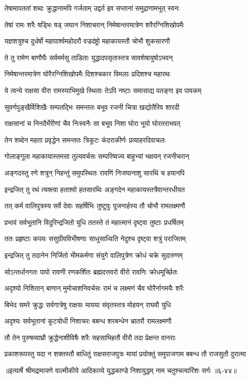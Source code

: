 \twolineshloka
{तेषामापततां शब्दः क्रुद्धानामपि गर्जताम्}
{उद्वर्त इव सप्तानां समुद्राणामभूत् स्वनः} %

\twolineshloka
{तेषां रामः शरैः षड्भिः षड् जघान निशाचरान्}
{निमेषान्तरमात्रेण शरैरग्निशिखोपमैः} %

\twolineshloka
{यज्ञशत्रुश्च दुर्धर्षो महापार्श्वमहोदरौ}
{वज्रदंष्ट्रो महाकायस्तौ चोभौ शुकसारणौ} %

\twolineshloka
{ते तु रामेण बाणौघैः सर्वमर्मसु ताडिताः}
{युद्धादपसृतास्तत्र सावशेषायुषोऽभवन्} %

\twolineshloka
{निमेषान्तरमात्रेण घोरैरग्निशिखोपमैः}
{दिशश्चकार विमलाः प्रदिशश्च महारथः} %

\twolineshloka
{ये त्वन्ये राक्षसा वीरा रामस्याभिमुखे स्थिताः}
{तेऽपि नष्टाः समासाद्य पतङ्गा इव पावकम्} %

\twolineshloka
{सुवर्णपुङ्खैर्विशिखैः सम्पतद्भिः समन्ततः}
{बभूव रजनी चित्रा खद्योतैरिव शारदी} %

\twolineshloka
{राक्षसानां च निनदैर्भेरीणां चैव निःस्वनैः}
{सा बभूव निशा घोरा भूयो घोरतराभवत्} %

\twolineshloka
{तेन शब्देन महता प्रवृद्धेन समन्ततः}
{त्रिकूटः कंदराकीर्णः प्रव्याहरदिवाचलः} %

\twolineshloka
{गोलाङ्गूला महाकायास्तमसा तुल्यवर्चसः}
{सम्परिष्वज्य बाहुभ्यां भक्षयन् रजनीचरान्} %

\twolineshloka
{अङ्गदस्तु रणे शत्रून् निहन्तुं समुपस्थितः}
{रावणिं निजघानाशु सारथिं च हयानपि} %

\twolineshloka
{इन्द्रजित् तु रथं त्यक्त्वा हताश्वो हतसारथिः}
{अङ्गदेन महाकायस्तत्रैवान्तरधीयत} %

\twolineshloka
{तत् कर्म वालिपुत्रस्य सर्वे देवाः सहर्षिभिः}
{तुष्टुवुः पूजनार्हस्य तौ चोभौ रामलक्ष्मणौ} %

\twolineshloka
{प्रभावं सर्वभूतानि विदुरिन्द्रजितो युधि}
{ततस्ते तं महात्मानं दृष्ट्वा तुष्टाः प्रधर्षितम्} %

\twolineshloka
{ततः प्रहृष्टाः कपयः ससुग्रीवविभीषणाः}
{साधुसाध्विति नेदुश्च दृष्ट्वा शत्रुं पराजितम्} %

\twolineshloka
{इन्द्रजित् तु तदानेन निर्जितो भीमकर्मणा}
{संयुगे वालिपुत्रेण क्रोधं चक्रे सुदारुणम्} %

\twolineshloka
{सोऽन्तर्धानगतः पापो रावणी रणकर्शितः}
{ब्रह्मदत्तवरो वीरो रावणिः क्रोधमूर्च्छितः} %

\twolineshloka
{अदृश्यो निशितान् बाणान् मुमोचाशनिवर्चसः}
{रामं च लक्ष्मणं चैव घोरैर्नागमयैः शरैः} %

\twolineshloka
{बिभेद समरे क्रुद्धः सर्वगात्रेषु राक्षसः}
{मायया संवृतस्तत्र मोहयन् राघवौ युधि} %

\twolineshloka
{अदृश्यः सर्वभूतानां कूटयोधी निशाचरः}
{बबन्ध शरबन्धेन भ्रातरौ रामलक्ष्मणौ} %

\twolineshloka
{तौ तेन पुरुषव्याघ्रौ क्रुद्धेनाशीविषैः शरैः}
{सहसाभिहतौ वीरौ तदा प्रेक्षन्त वानराः} %

\twolineshloka
{प्रकाशरूपस्तु यदा न शक्तस्तौ बाधितुं राक्षसराजपुत्रः}
{मायां प्रयोक्तुं समुपाजगाम बबन्ध तौ राजसुतौ दुरात्मा} %


॥इत्यार्षे श्रीमद्रामायणे वाल्मीकीये आदिकाव्ये युद्धकाण्डे निशायुद्धम् नाम चतुश्चत्वारिंशः सर्गः ॥६-४४॥
